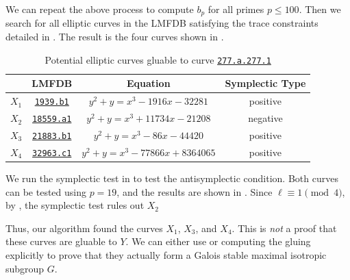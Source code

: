 \documentclass{amsproc}
\numberwithin{equation}{section}
\theoremstyle{definition}
\theoremstyle{remark}
\begin{document}
    We can repeat the above process to compute $b_p$ for all primes $p\leq 100$. Then we search for all elliptic curves in the LMFDB satisfying the trace constraints detailed in .
    The result is the four curves shown in .
    \begin{table}[ht]
    \centering
    \begin{tabular}{cccc}
        & LMFDB & Equation & Symplectic Type \\ \hline
        $X_1$ & 
        \href{https://www.lmfdb.org/EllipticCurve/Q/1939/b/1}{\texttt{1939.b1}}
         & $y^2+y=x^3-1916x-32281$
        & positive\\
        $X_2$
        & \href{https://www.lmfdb.org/EllipticCurve/Q/18559/a/1}{\texttt{18559.a1}}
        & $y^2+y=x^3+11734x-21208$ 
        & negative \\
        $X_3$
        &\href{https://www.lmfdb.org/EllipticCurve/Q/21883/b/1}{\texttt{21883.b1}}
        & $y^2+y=x^3-86x-44420$ 
        & positive \\
        $X_4$
        & \href{https://www.lmfdb.org/EllipticCurve/Q/32963/c/1}{\texttt{32963.c1}}
        & $y^2+y=x^3-77866x+8364065$ 
        & positive \\
    \end{tabular}
    \caption{Potential elliptic curves gluable to curve \href{https://www.lmfdb.org/Genus2Curve/Q/277/a/277/1}{\texttt{277.a.277.1}}}
        \label{table:gluable_curves}
    \end{table}
    
    We run the symplectic test in  to test the antisymplectic condition. Both curves can be tested using $p=19$, and the results are shown in . Since $\ell\equiv 1\pmod 4$, by , the symplectic test rules out $X_2$

    Thus, our algorithm found the curves $X_1$, $X_3$, and $X_4$. This is \emph{not} a proof that these curves are gluable to $Y$. We can either use  or computing the gluing explicitly to prove that they actually form a Galois stable maximal isotropic subgroup $G$.
\end{document}
